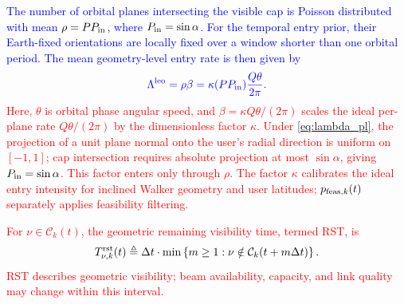 \documentclass[10pt,letterpaper,journal]{IEEEtran}
\newcommand{\revnew}[1]{\textcolor{red}{#1}}
\begin{document}
\textcolor{blue}{The number of orbital planes intersecting the visible cap is Poisson distributed with mean $\rho=PP_{\rm in}$, where $P_{\rm in}=\sin\alpha$.
For the temporal entry prior, their Earth-fixed orientations are locally fixed over a window shorter than one orbital period.
The mean geometry-level entry rate is then given by}
\begin{equation}
\textcolor{blue}{
\Lambda^{\rm leo}
=\rho\beta
=\kappa(PP_{\rm in})\frac{Q\theta}{2\pi}.
}
\label{eq:Lambda_leo_form}
\end{equation}
\revnew{Here, $\theta$ is orbital phase angular speed, and $\beta=\kappa Q\theta/(2\pi)$ scales the ideal per-plane rate $Q\theta/(2\pi)$ by the dimensionless factor $\kappa$.}
\revnew{Under \eqref{eq:lambda_pl}, the projection of a unit plane normal onto the user's radial direction is uniform on $[-1,1]$; cap intersection requires absolute projection at most $\sin\alpha$, giving $P_{\rm in}=\sin\alpha$. This factor enters only through $\rho$. The factor $\kappa$ calibrates the ideal entry intensity for inclined Walker geometry and user latitudes; $p_{{\rm feas},k}(t)$ separately applies feasibility filtering.}


\revnew{For $\nu\in\mathcal C_k(t)$, the geometric remaining visibility time, termed RST, is}
\begin{equation}
T^{\rm rst}_{\nu,k}(t)
\triangleq
\Delta t\cdot
\min
\left\{
m\ge 1:
\nu\notin \mathcal C_k(t+m\Delta t)
\right\}.
\label{eq:geometry_rst}
\end{equation}
\revnew{RST describes geometric visibility; beam availability, capacity, and link quality may change within this interval.}


\vspace{-2mm}
\end{document}
